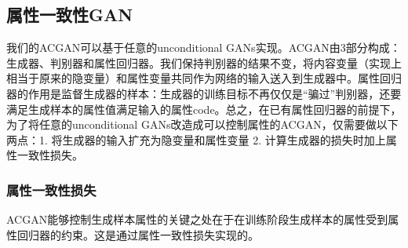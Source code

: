 \subsection{属性一致性GAN}
我们的ACGAN可以基于任意的unconditional GANs实现。ACGAN由3部分构成：生成器、判别器和属性回归器。我们保持判别器的结果不变，将内容变量（实现上相当于原来的隐变量）和属性变量共同作为网络的输入送入到生成器中。属性回归器的作用是监督生成器的样本：生成器的训练目标不再仅仅是“骗过”判别器，还要满足生成样本的属性值满足输入的属性code。总之，在已有属性回归器的前提下，为了将任意的unconditional GANs改造成可以控制属性的ACGAN，仅需要做以下两点：1. 将生成器的输入扩充为隐变量和属性变量 2. 计算生成器的损失时加上属性一致性损失。

\subsubsection{属性一致性损失}
ACGAN能够控制生成样本属性的关键之处在于在训练阶段生成样本的属性受到属性回归器的约束。这是通过属性一致性损失实现的。

